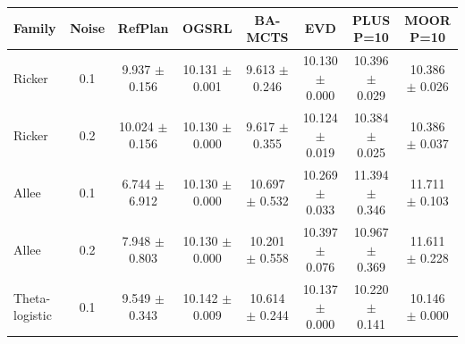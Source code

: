 \documentclass[10pt]{article}
\begin{document}
\begin{table}[p]
\centering
\small
\setlength{\tabcolsep}{3.0pt}
\begin{tabular}{@{}lc*{6}{c}@{}}
\toprule
Family & Noise & RefPlan & OGSRL & BA-MCTS & EVD & PLUS P=10 & MOOR P=10 \\
\midrule
Ricker & 0.1 & \shortstack{9.937\\$\pm$ 0.156} & \shortstack{10.131\\$\pm$ 0.001} & \shortstack{9.613\\$\pm$ 0.246} & \shortstack{10.130\\$\pm$ 0.000} & \shortstack{10.396\\$\pm$ 0.029} & \shortstack{10.386\\$\pm$ 0.026} \\
Ricker & 0.2 & \shortstack{10.024\\$\pm$ 0.156} & \shortstack{10.130\\$\pm$ 0.000} & \shortstack{9.617\\$\pm$ 0.355} & \shortstack{10.124\\$\pm$ 0.019} & \shortstack{10.384\\$\pm$ 0.025} & \shortstack{10.386\\$\pm$ 0.037} \\
\addlinespace[1.5pt]
Allee & 0.1 & \shortstack{6.744\\$\pm$ 6.912} & \shortstack{10.130\\$\pm$ 0.000} & \shortstack{10.697\\$\pm$ 0.532} & \shortstack{10.269\\$\pm$ 0.033} & \shortstack{11.394\\$\pm$ 0.346} & \shortstack{11.711\\$\pm$ 0.103} \\
Allee & 0.2 & \shortstack{7.948\\$\pm$ 0.803} & \shortstack{10.130\\$\pm$ 0.000} & \shortstack{10.201\\$\pm$ 0.558} & \shortstack{10.397\\$\pm$ 0.076} & \shortstack{10.967\\$\pm$ 0.369} & \shortstack{11.611\\$\pm$ 0.228} \\
\addlinespace[1.5pt]
Theta-logistic & 0.1 & \shortstack{9.549\\$\pm$ 0.343} & \shortstack{10.142\\$\pm$ 0.009} & \shortstack{10.614\\$\pm$ 0.244} & \shortstack{10.137\\$\pm$ 0.000} & \shortstack{10.220\\$\pm$ 0.141} & \shortstack{10.146\\$\pm$ 0.000} \\

\end{tabular}
\end{table}
\end{document}
